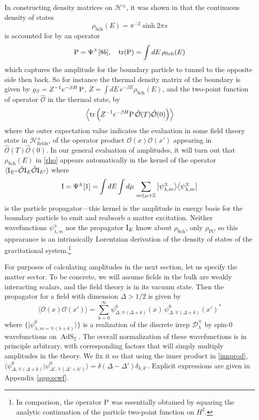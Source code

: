 \documentclass[12pt]{article}
\newcommand{\be}{\begin{equation}}
\newcommand{\ee}{\end{equation}}
\newcommand{\hgfs}{\mathbf{F}}
\newcommand{\blangle}{\bigl\langle}
\newcommand{\brangle}{\bigr\rangle}
\newcommand*{\bbra}[1]{\blangle{#1}\big|}
\newcommand*{\bket}[1]{\big|{#1}\brangle}
\newcommand*{\corr}[1]{\langle{#1}\rangle}
\newcommand*{\bcorr}[1]{\blangle{#1}\brangle}
\newcommand{\calD}{\mathcal{D}}
\newcommand{\calH}{\mathcal{H}}
\newcommand{\calO}{\mathcal{O}}
\DeclareMathOperator{\tAdS}{\widetilde{AdS}}
\DeclareMathOperator{\HH}{H}
\newcommand{\bt}{\beta}
\newcommand{\lam}{\lambda}
\newcommand{\Ga}{\Gamma}
\newcommand{\de}{\delta}
\newcommand{\De}{\Delta}
\newcommand{\ov}{\over}
\def\widetilde#1{#1}%
\def\HH{H}
\begin{document}
In constructing density matrices on $\calH^{\pm}$, it was shown in \cite{KiSuh18} that the continuous density of states 
\be \label{rho}
\rho_{\text{Sch}}(E)=\pi^{-2}\sinh 2 \pi s
\ee
is accounted for by an operator 
\be \label{P}
{\rm P}=\Psi^{\pm}[8 b], \quad  \text{tr}({\rm P})=\int dE\, \rho_{\text{Sch}}(E)
\ee
which captures the amplitude for the boundary particle to tunnel to the opposite side then back. So for instance the thermal density matrix of the boundary is given by $\varrho_{\bt}=Z^{-1}e^{-\bt H}\, {\rm P}$, $Z=\int dE\, e^{-\bt E} \rho_{\text{Sch}}(E)$, and the two-point function of operator $\hat{\calO}$ in the thermal state, by
\be \label{twopcorr}
\left\langle\text{tr}\left( Z^{-1}e^{-\bt H} {\rm P}\, \hat{\calO}(T)\hat{\calO}(0)\right)\right \rangle
\ee
where the outer expectation value indicates the evaluation in some field theory state in $\calH^{\pm}_{\text{fields}}$, of the operator product $\calO(x)\calO(x')$ appearing in $\hat{\calO}(T) \hat{\calO}(0)$. In our general evaluation of amplitudes, it will turn out that $\rho_{\text{Sch}}(E)$ in \eqref{rho} appears automatically in the kernel of the operator $\corr{{\rm I}_{E''}\hat{\calO} {\rm I}_{E} \hat{\calO}{\rm I}_{E'}}$ where
\be \label{proj}
{\rm I}=\Psi^{\pm}[1]=\int dE \int d\mu\,  \sum_{m \in \mu + \mathbb{Z}} \bket{\psi^{\pm}_{\lambda, m}}\bbra{ \psi^{\pm}_{\lambda, m}}
\ee
is the particle propagator---this kernel is the amplitude in energy basis for the boundary particle to emit and reabsorb a matter excitation. Neither wavefunctions $\psi^{\pm}_{\lam, m}$ nor the propagator ${\rm I}_E$ know about $\rho_{\text{Sch}}$, only $\rho_{\text{Pl}}$, so this appearance is an intrinsically Lorentzian derivation of the density of states of the gravitational system.\footnote{In comparison, the operator ${\rm P}$ was essentially obtained by squaring the analytic continuation of the particle two-point function on $\HH^2$.}

For purposes of calculating amplitudes in the next section, let us specify the matter sector. To be concrete, we will assume fields in the bulk are weakly interacting scalars, and the field theory is in its vacuum state. Then the propagator for a field with dimension $\De>1/2$ is given by 
\be \label{twop}
\corr{\calO(x)\calO(x')}=\sum_{k=0}^{\infty}\psi^{0}_{\De,\mp(\De+k)}(x)\,\psi^{0}_{\De,\mp(\De+k)}(x')^{*}
\ee
where $\big\{\bket{\psi^{0}_{\lam,m=\mp(\lam+k)}}\big\}$ is a realization of the discrete irrep $\calD^{\mp}_{\lam}$ by spin-$0$ wavefunctions on $\tAdS_2$. The overall normalization of these wavefunctions is in principle arbitrary, with corresponding factors that will simply multiply amplitudes in the theory. We fix it so that using the inner product in \eqref{innprod}, $\bcorr{\psi^{0}_{\De, \mp(\De+k)} | \psi^{0}_{\De',\mp(\De'+k')}}=\de(\De-\De')\de_{k, k'}$. 
Explicit expressions are given in Appendix \ref{app:scwf}. 
\end{document}
